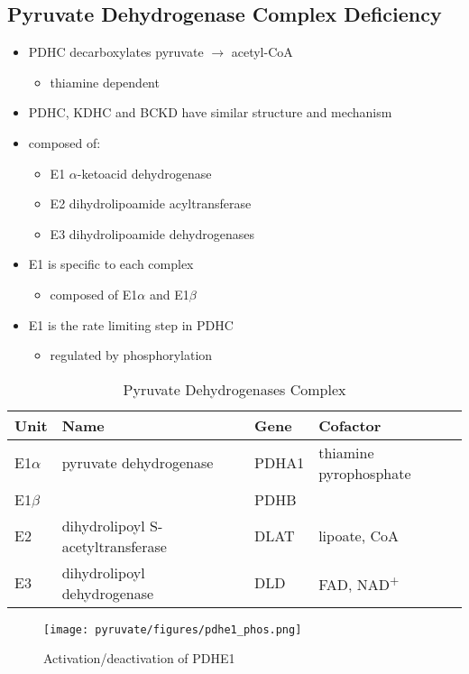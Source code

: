 \documentclass{scrartcl}
\begin{document}
\subsection{Pyruvate Dehydrogenase Complex Deficiency}
\label{sec:orgc4c9918}
\begin{itemize}
\item PDHC decarboxylates pyruvate \(\to\) acetyl-CoA
\begin{itemize}
\item thiamine dependent
\end{itemize}
\item PDHC, KDHC and BCKD have similar structure and mechanism
\item composed of:
\begin{itemize}
\item E1 \(\alpha\)-ketoacid dehydrogenase
\item E2 dihydrolipoamide acyltransferase
\item E3 dihydrolipoamide dehydrogenases
\end{itemize}
\item E1 is specific to each complex
\begin{itemize}
\item composed of E1\(\alpha\) and E1\(\beta\)
\end{itemize}
\item E1 is the rate limiting step in PDHC
\begin{itemize}
\item regulated by phosphorylation
\end{itemize}
\end{itemize}

\begin{table}[htbp]
\caption{\label{tab:orgc500029}Pyruvate Dehydrogenases Complex}
\centering
\begin{tabular}{llll}
Unit & Name & Gene & Cofactor\\
\hline
E1\(\alpha\) & pyruvate dehydrogenase & PDHA1 & thiamine pyrophosphate\\
E1\(\beta\) &  & PDHB & \\
E2 & dihydrolipoyl  S-acetyltransferase & DLAT & lipoate, CoA\\
E3 & dihydrolipoyl dehydrogenase & DLD & FAD, NAD\textsuperscript{+}\\
\end{tabular}
\end{table}

\begin{figure}[htbp]
\centering
\texttt{[image: pyruvate/figures/pdhe1\_phos.png]}
\caption[pdhe1]{\label{fig:org043bfd5}Activation/deactivation of PDHE1}
\end{figure}
\end{document}
